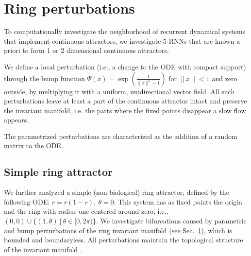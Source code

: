 \documentclass{article} %
\newcounter{ct}
\theoremstyle{definition}
\theoremstyle{remark}
\begin{document}
\newpage
\section{Ring perturbations}\label{sec:supp:ring_perturbations}


To computationally investigate the neighborhood of recurrent dynamical systems that implement continuous attractors, we investigate 5 RNNs that are known a priori to form 1 or 2 dimensional continuous attractors.

We define a local perturbation (i.e., a change to the ODE with compact support) through the bump function $\Psi(x) = \exp\left(\frac{1}{\|x\|^2-1}\right)$ for $\|x\|<1$ and zero outside, by multiplying it with a uniform, unidirectional vector field. All such perturbations leave at least a part of the continuous attractor intact and preserve the invariant manifold, i.e. the parts where the fixed points disappear a slow flow appears.

The parametrized perturbations are characterized as the addition of a random matrix to the ODE. 





\subsection{Simple ring attractor}
We further analyzed a simple (non-biological)  ring attractor, defined by the following ODE: $\dot r = r(1-r), \ \dot \theta = 0.$
This system has as fixed points the origin and the ring with radius one centered around zero, i.e., $(0,0)\cup\{(1,\theta)\ |\ \theta\in[0,2\pi)\}$.
We investigate bifurcations caused by parametric and bump perturbations of the ring invariant manifold (see Sec.~\ref{sec:supp:ring_perturbations}), which is bounded and boundaryless.
All perturbations maintain the topological structure of the invariant manifold . %


\end{document}
